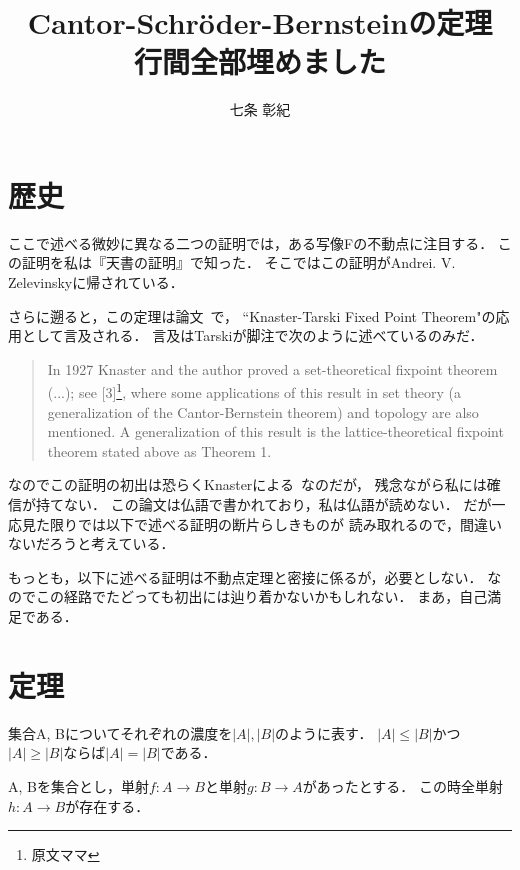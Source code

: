 \documentclass[a4j, 10pt]{jarticle}
\title{Cantor-Schr\"{o}der-Bernsteinの定理 \\
 \normalsize{行間全部埋めました}}
\author{七条 彰紀}
\begin{document}
    \maketitle
    
    \section{歴史}
        ここで述べる微妙に異なる二つの証明では，ある写像Fの不動点に注目する．
        この証明を私は『天書の証明』で知った．
        そこではこの証明がAndrei. V. Zelevinskyに帰されている．
        
        さらに遡ると，この定理は論文~\cite{tarski}で，
        ``Knaster-Tarski Fixed Point Theorem"の応用として言及される．
        言及はTarskiが脚注で次のように述べているのみだ．
        \begin{quote}
            In 1927 Knaster and the author proved
            a set-theoretical fixpoint theorem (...);
            see [3]\footnote{原文ママ},
            where some applications of this result in set theory
            (a generalization of the Cantor-Bernstein theorem) and
            topology are also mentioned.
            A generalization of this result is the lattice-theoretical
            fixpoint theorem stated above as Theorem 1.
        \end{quote}

        なのでこの証明の初出は恐らくKnasterによる~\cite{knaster}なのだが，
        残念ながら私には確信が持てない．
        この論文は仏語で書かれており，私は仏語が読めない．
        だが一応見た限りでは以下で述べる証明の断片らしきものが
        読み取れるので，間違いないだろうと考えている．

        もっとも，以下に述べる証明は不動点定理と密接に係るが，必要としない．
        なのでこの経路でたどっても初出には辿り着かないかもしれない．
        まあ，自己満足である．

    \section{定理}
        \begin{Them}[表現1]
            集合A, Bについてそれぞれの濃度を$|A|, |B|$のように表す．
            $|A| \leq |B|$かつ$|A| \geq |B|$ならば$|A|=|B|$である．
        \end{Them}

        \begin{Them}[表現2]
            A, Bを集合とし，単射$f:A \to B$と単射$g: B \to A$があったとする．
            この時全単射$h:A \to B$が存在する．
        \end{Them}
\end{document}

